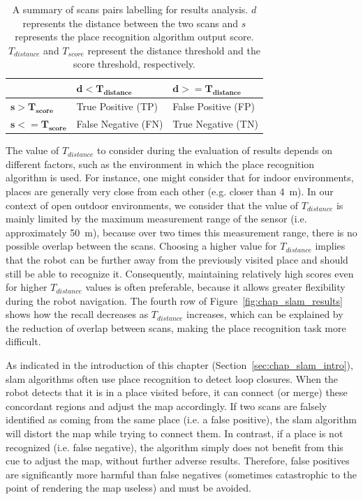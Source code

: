 \begin{table}
    \centering
    \begin{tabular}{@{}l|ll@{}}
        \toprule
                                  & $\mathbf{d < T_{distance}}$ & $\mathbf{d >= T_{distance}}$ \\
        \hline
        $\mathbf{s > T_{score}}$  & True Positive (TP)          & False Positive (FP) \\
        $\mathbf{s <= T_{score}}$ & False Negative (FN)         & True Negative (TN) \\
        \bottomrule
    \end{tabular}
    \caption[Summary of scans pairs labelling for results analysis.]{A summary of scans pairs labelling for results analysis. $d$ represents the distance between the two scans and $s$ represents the place recognition algorithm output score. $T_{distance}$ and $T_{score}$ represent the distance threshold and the score threshold, respectively.}
    \label{tab:chap_slam_results_labeling}
\end{table}

The value of $T_{distance}$ to consider during the evaluation of results depends on different factors, such as the environment in which the place recognition algorithm is used. For instance, one might consider that for indoor environments, places are generally very close from each other (e.g. closer than \SI{4}{\meter}). In our context of open outdoor environments, we consider that the value of $T_{distance}$ is mainly limited by the maximum measurement range of the sensor (i.e. approximately \SI{50}{\meter}), because over two times this measurement range, there is no possible overlap between the scans. Choosing a higher value for $T_{distance}$ implies that the robot can be further away from the previously visited place and should still be able to recognize it. Consequently, maintaining relatively high scores even for higher $T_{distance}$ values is often preferable, because it allows greater flexibility during the robot navigation. The fourth row of Figure~\ref{fig:chap_slam_results} shows how the recall decreases as $T_{distance}$ increases, which can be explained by the reduction of overlap between scans, making the place recognition task more difficult.

As indicated in the introduction of this chapter (Section~\ref{sec:chap_slam_intro}), \gls*{slam} algorithms often use place recognition to detect loop closures. When the robot detects that it is in a place visited before, it can connect (or merge) these concordant regions and adjust the map accordingly. If two scans are falsely identified as coming from the same place (i.e. a false positive), the \gls*{slam} algorithm will distort the map while trying to connect them. In contrast, if a place is not recognized (i.e. false negative), the algorithm simply does not benefit from this cue to adjust the map, without further adverse results. Therefore, false positives are significantly more harmful than false negatives (sometimes catastrophic to the point of rendering the map useless) and must be avoided. 

